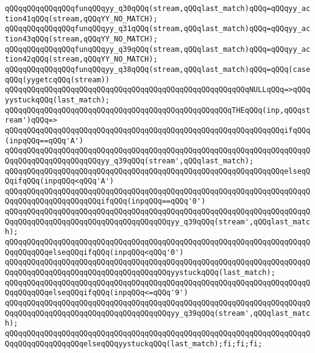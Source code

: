 \verb|qQQqqQQqqQQqqQQqfunqQQqyy_q30qQQq(stream,qQQqlast_match)qQQq=qQQqyy_action41qQQq(stream,qQQqYY_NO_MATCH);|\newline
\verb|qQQqqQQqqQQqqQQqfunqQQqyy_q31qQQq(stream,qQQqlast_match)qQQq=qQQqyy_action43qQQq(stream,qQQqYY_NO_MATCH);|\newline
\verb|qQQqqQQqqQQqqQQqfunqQQqyy_q39qQQq(stream,qQQqlast_match)qQQq=qQQqyy_action42qQQq(stream,qQQqYY_NO_MATCH);|\newline
\verb|qQQqqQQqqQQqqQQqfunqQQqyy_q38qQQq(stream,qQQqlast_match)qQQq=qQQq(caseqQQq(yygetcqQQq(stream))|\newline
\verb|qQQqqQQqqQQqqQQqqQQqqQQqqQQqqQQqqQQqqQQqqQQqqQQqqQQqqQQqNULLqQQq=>qQQqyystuckqQQq(last_match);|\newline
\verb|qQQqqQQqqQQqqQQqqQQqqQQqqQQqqQQqqQQqqQQqqQQqqQQqqQQqTHEqQQq(inp,qQQqstream')qQQq=>|\newline
\verb|qQQqqQQqqQQqqQQqqQQqqQQqqQQqqQQqqQQqqQQqqQQqqQQqqQQqqQQqqQQqqQQqifqQQq(inpqQQq==qQQq'A')|\newline
\verb|qQQqqQQqqQQqqQQqqQQqqQQqqQQqqQQqqQQqqQQqqQQqqQQqqQQqqQQqqQQqqQQqqQQqqQQqqQQqqQQqqQQqqQQqqQQqyy_q39qQQq(stream',qQQqlast_match);|\newline
\verb|qQQqqQQqqQQqqQQqqQQqqQQqqQQqqQQqqQQqqQQqqQQqqQQqqQQqqQQqqQQqqQQqelseqQQqifqQQq(inpqQQq<qQQq'A')|\newline
\verb|qQQqqQQqqQQqqQQqqQQqqQQqqQQqqQQqqQQqqQQqqQQqqQQqqQQqqQQqqQQqqQQqqQQqqQQqqQQqqQQqqQQqqQQqqQQqifqQQq(inpqQQq==qQQq'0')|\newline
\verb|qQQqqQQqqQQqqQQqqQQqqQQqqQQqqQQqqQQqqQQqqQQqqQQqqQQqqQQqqQQqqQQqqQQqqQQqqQQqqQQqqQQqqQQqqQQqqQQqqQQqqQQqqQQqyy_q39qQQq(stream',qQQqlast_match);|\newline
\verb|qQQqqQQqqQQqqQQqqQQqqQQqqQQqqQQqqQQqqQQqqQQqqQQqqQQqqQQqqQQqqQQqqQQqqQQqqQQqqQQqelseqQQqifqQQq(inpqQQq<qQQq'0')|\newline
\verb|qQQqqQQqqQQqqQQqqQQqqQQqqQQqqQQqqQQqqQQqqQQqqQQqqQQqqQQqqQQqqQQqqQQqqQQqqQQqqQQqqQQqqQQqqQQqqQQqqQQqqQQqqQQqyystuckqQQq(last_match);|\newline
\verb|qQQqqQQqqQQqqQQqqQQqqQQqqQQqqQQqqQQqqQQqqQQqqQQqqQQqqQQqqQQqqQQqqQQqqQQqqQQqqQQqelseqQQqifqQQq(inpqQQq<=qQQq'9')|\newline
\verb|qQQqqQQqqQQqqQQqqQQqqQQqqQQqqQQqqQQqqQQqqQQqqQQqqQQqqQQqqQQqqQQqqQQqqQQqqQQqqQQqqQQqqQQqqQQqqQQqqQQqqQQqqQQqyy_q39qQQq(stream',qQQqlast_match);|\newline
\verb|qQQqqQQqqQQqqQQqqQQqqQQqqQQqqQQqqQQqqQQqqQQqqQQqqQQqqQQqqQQqqQQqqQQqqQQqqQQqqQQqqQQqqQQqelseqQQqyystuckqQQq(last_match);fi;fi;fi;|\newline
